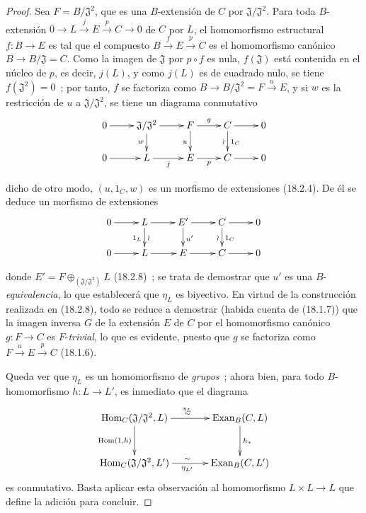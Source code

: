 \begin{proof}
Sea $F=B/\mathfrak J^2$, que es una $B$-extensión de $C$ por
$\mathfrak J/\mathfrak J^2$. Para toda $B$-extensión
$0\to L\xrightarrow{j}E\xrightarrow{p}C\to0$
de $C$ por $L$, el homomorfismo estructural $f:B\to E$ es tal que el compuesto
$B\xrightarrow{f}E\xrightarrow{p}C$ es el homomorfismo canónico
$B\to B/\mathfrak J=C$. Como la imagen de $\mathfrak J$ por $p\circ f$ es
nula, $f(\mathfrak J)$ está contenida en el núcleo de $p$, es decir,
$j(L)$, y como $j(L)$ es de cuadrado nulo, se tiene $f(\mathfrak J^2)=0$~; por tanto,
$f$ se factoriza como
$B\to B/\mathfrak J^2=F\xrightarrow{u}E$, y si $w$ es la restricción de
$u$ a $\mathfrak J/\mathfrak J^2$, se tiene un diagrama conmutativo
\[
  \xymatrix@C=2pc@R=1.5pc{
    0\ar[r] & \mathfrak J/\mathfrak J^2\ar[r]\ar[d]_w
      & F\ar[r]^g\ar[d]_u
      & C\ar[r]\ar[d]^{1_C}_{\wr} & 0\\
    0\ar[r] & L\ar[r]_j & E\ar[r]_p & C\ar[r] & 0
  }
\]

dicho de otro modo, $(u,1_C,w)$ es un morfismo de extensiones (18.2.4). De él se
deduce un morfismo de extensiones
\[
  \xymatrix@C=2pc@R=1.5pc{
    0\ar[r] & L\ar[r]\ar[d]_{1_L}^{\wr}
      & E'\ar[r]\ar[d]^{u'}
      & C\ar[r]\ar[d]^{1_C}_{\wr} & 0\\
    0\ar[r] & L\ar[r] & E\ar[r] & C\ar[r] & 0
  }
\]

donde $E'=F\oplus_{(\mathfrak J/\mathfrak J^2)}L$ (18.2.8)~; se trata de
demostrar que $u'$ es una $B$-\emph{equivalencia}, lo que establecerá que $\eta_L$
es biyectivo. En virtud de la construcción realizada en (18.2.8), todo se reduce a
demostrar (habida cuenta de (18.1.7)) que la imagen inversa $G$ de la extensión
$E$ de $C$ por el homomorfismo canónico $g:F\to C$ es $F$-\emph{trivial}, lo que
es evidente, puesto que $g$ se factoriza como
$F\xrightarrow{u}E\xrightarrow{p}C$ (18.1.6).

Queda ver que $\eta_L$ es un homomorfismo de \emph{grupos}~; ahora bien, para
todo $B$-homomorfismo $h:L\to L'$, es inmediato que el diagrama
\[
  \xymatrix@C=3pc@R=2.4pc{
    \operatorname{Hom}_C(\mathfrak J/\mathfrak J^2,L)
      \ar[r]^{\overset{\eta_L}{\sim}}\ar[d]_{\operatorname{Hom}(1,h)}
      & \operatorname{Exan}_B(C,L)\ar[d]^{h_*}\\
    \operatorname{Hom}_C(\mathfrak J/\mathfrak J^2,L')
      \ar[r]_{\eta_{L'}}^{\sim}
      & \operatorname{Exan}_B(C,L')
  }
\]
es conmutativo. Basta aplicar esta observación al homomorfismo
$L\times L\to L$ que define la adición para concluir.
\end{proof}

